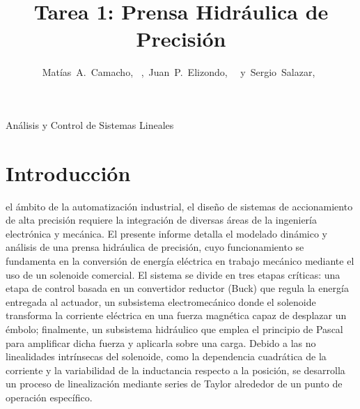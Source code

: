 \documentclass[journal]{IEEEtran}
\begin{document}
\setlength{\parindent}{4.2mm}
%
\title{Tarea 1: Prensa Hidráulica de Precisión}


\author{Matías~A.~Camacho,~
        ,~Juan~P.~Elizondo,~
        ~y~Sergio~Salazar,~
}


%
{Análisis y Control de Sistemas Lineales}


\maketitle



\section{Introducción}

 el ámbito de la automatización industrial, el diseño de sistemas de accionamiento de alta precisión 
requiere la integración de diversas áreas de la ingeniería electrónica y mecánica. El presente 
informe detalla el modelado dinámico y análisis de una prensa hidráulica de precisión, cuyo funcionamiento 
se fundamenta en la conversión de energía eléctrica en trabajo mecánico mediante el uso de un solenoide comercial.
El sistema se divide en tres etapas críticas: una etapa de control basada en 
un convertidor reductor (Buck) que regula la energía entregada al actuador, un subsistema electromecánico 
donde el solenoide transforma la corriente eléctrica en una fuerza magnética capaz de desplazar un émbolo; finalmente, 
un subsistema hidráulico que emplea el principio de Pascal para amplificar dicha fuerza y aplicarla 
sobre una carga. Debido a las no linealidades intrínsecas del solenoide, como la dependencia 
cuadrática de la corriente y la variabilidad de la inductancia respecto a la posición, se desarrolla un proceso 
de linealización mediante series de Taylor alrededor de un punto de operación específico.
\end{document}
